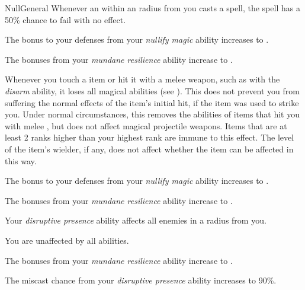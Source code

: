 \begin{feat}{Null}{General}
         Whenever an  within an \areamed radius from you casts a spell, the spell has a 50\% chance to fail with no effect.

         The bonus to your defenses from your \textit{nullify magic} ability increases to .

         The bonuses from your \textit{mundane resilience} ability increase to .

         Whenever you touch a  item or hit it with a melee weapon, such as with the \textit{disarm} ability, it  loses all magical abilities (see ).
        This does not prevent you from suffering the normal effects of the item's initial hit, if the item was used to strike you.
        Under normal circumstances, this removes the abilities of items that hit you with melee , but does not affect magical projectile weapons.
        Items that are at least 2 ranks higher than your highest rank are immune to this effect.
        The level of the item's wielder, if any, does not affect whether the item can be affected in this way.

         The bonus to your defenses from your \textit{nullify magic} ability increases to .

         The bonuses from your \textit{mundane resilience} ability increase to .

         Your \textit{disruptive presence} ability affects all enemies in a \areahuge radius  from you.

         You are unaffected by all  abilities.

         The bonuses from your \textit{mundane resilience} ability increase to .

         The miscast chance from your \textit{disruptive presence} ability increases to 90\%.
    \end{feat}

